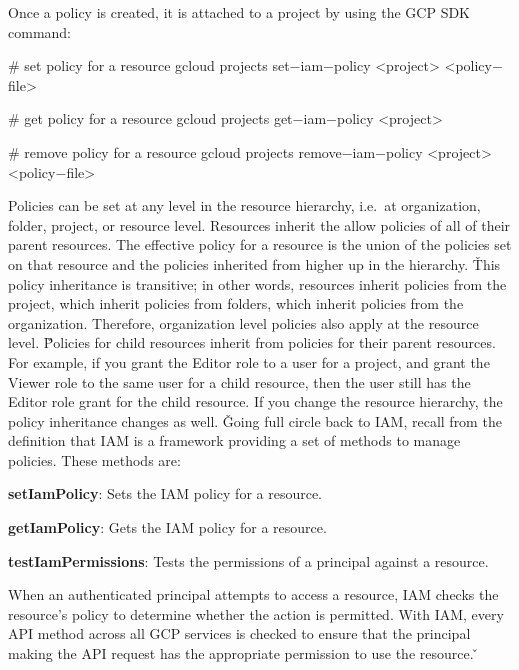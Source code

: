 Once a policy is created, it is attached to a project by using the GCP SDK command:
\begin{bash}
# set policy for a resource
gcloud projects set$-$iam$-$policy <project> <policy$-$file>
\end{bash}

\begin{bash}
# get policy for a resource
gcloud projects get$-$iam$-$policy <project>
\end{bash}

\begin{bash}
# remove policy for a resource
gcloud projects remove$-$iam$-$policy <project> <policy$-$file>
\end{bash}

Policies can be set at any level in the resource hierarchy, i.e.\ at organization, folder, project, or resource level.
Resources inherit the allow policies of all of their parent resources. The effective policy for a resource is the
union of the policies set on that resource and the policies inherited from higher up in the hierarchy. \v

This policy inheritance is transitive; in other words, resources inherit policies from the project, which inherit
policies from folders, which inherit policies from the organization. Therefore, organization level policies also
apply at the resource level. \v

Policies for child resources inherit from policies for their parent resources. For example, if you grant
the Editor role to a user for a project, and grant the Viewer role to the same user for a child resource, then the
user still has the Editor role grant for the child resource. If you change the resource hierarchy, the policy
inheritance changes as well. \v

Going full circle back to IAM, recall from the definition that IAM is a framework providing a set of methods to manage
policies. These methods are:
\bit
\item \textbf{setIamPolicy}: Sets the IAM policy for a resource.
\item \textbf{getIamPolicy}: Gets the IAM policy for a resource.
\item \textbf{testIamPermissions}: Tests the permissions of a principal against a resource.
\eit

When an authenticated principal attempts to access a resource, IAM checks the resource's policy to determine whether
the action is permitted. With IAM, every API method across all GCP services is checked to ensure that the principal
making the API request has the appropriate permission to use the resource. \v

